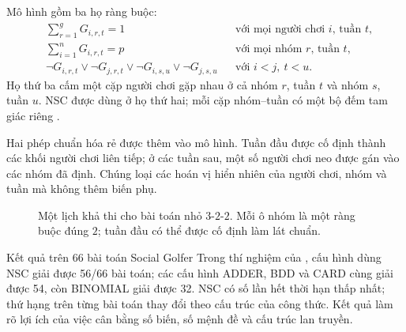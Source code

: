 Mô hình gồm ba họ ràng buộc:
\begin{align*}
  &\sum_{r=1}^{g}G_{i,r,t}=1
    &&\text{với mọi người chơi \(i\), tuần \(t\)},\\
  &\sum_{i=1}^{n}G_{i,r,t}=p
    &&\text{với mọi nhóm \(r\), tuần \(t\)},\\
  &\neg G_{i,r,t}\lor\neg G_{j,r,t}\lor
    \neg G_{i,s,u}\lor\neg G_{j,s,u}
    &&\text{với \(i<j,\ t<u\)}.
\end{align*}
Họ thứ ba cấm một cặp người chơi gặp nhau ở cả nhóm \(r\), tuần \(t\) và nhóm
\(s\), tuần \(u\). NSC được dùng ở họ thứ hai; mỗi cặp nhóm--tuần có một
bộ đếm tam giác riêng \parencite{kieu2026golfer}.

Hai phép chuẩn hóa rẻ được thêm vào mô hình. Tuần đầu được cố định thành các
khối người chơi liên tiếp; ở các tuần sau, một số người chơi neo được gán vào
các nhóm đã định. Chúng loại các hoán vị hiển nhiên của người chơi, nhóm và
tuần mà không thêm biến phụ.

\begin{figure}[tb]
\centering
{}
\caption{Một lịch khả thi cho bài toán nhỏ \(3\)-\(2\)-\(2\). Mỗi ô nhóm là
một ràng buộc đúng \(2\); tuần đầu có thể được cố định làm lát chuẩn.}
\label{fig:social-golfer-small}
\end{figure}

\begin{resultbox}{Kết quả trên 66 bài toán Social Golfer}
Trong thí nghiệm của \textcite{kieu2026golfer}, cấu hình dùng NSC giải được
56/66 bài toán; các cấu hình ADDER, BDD và CARD cùng giải được 54, còn
BINOMIAL giải được 32. NSC có số lần hết thời hạn thấp nhất; thứ hạng trên từng
bài toán thay đổi theo cấu trúc của công thức. Kết quả làm rõ lợi ích của việc
cân bằng số biến, số mệnh đề và cấu trúc lan truyền.
\end{resultbox}

